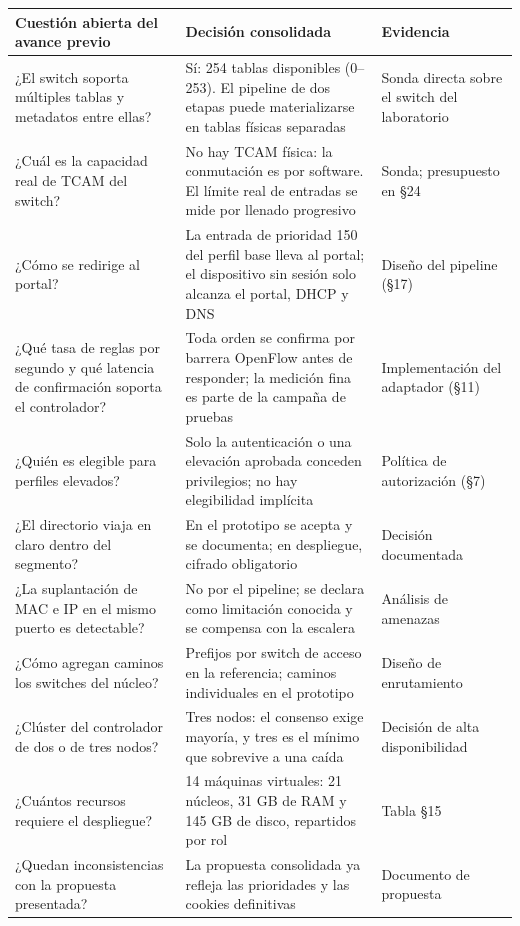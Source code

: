\documentclass[11pt,a4paper]{article}
\begin{document}
\begin{longtable}{p{4.2cm}p{5.2cm}p{4.6cm}}
\toprule
\textbf{Cuestión abierta del avance previo} & \textbf{Decisión consolidada} & \textbf{Evidencia}\\
\midrule
¿El switch soporta múltiples tablas y metadatos entre ellas? & Sí: 254 tablas disponibles (0--253). El pipeline de dos etapas puede materializarse en tablas físicas separadas & Sonda directa sobre el switch del laboratorio\\
¿Cuál es la capacidad real de TCAM del switch? & No hay TCAM física: la conmutación es por software. El límite real de entradas se mide por llenado progresivo & Sonda; presupuesto en §24\\
¿Cómo se redirige al portal? & La entrada de prioridad 150 del perfil base lleva al portal; el dispositivo sin sesión solo alcanza el portal, DHCP y DNS & Diseño del pipeline (§17)\\
¿Qué tasa de reglas por segundo y qué latencia de confirmación soporta el controlador? & Toda orden se confirma por barrera OpenFlow antes de responder; la medición fina es parte de la campaña de pruebas & Implementación del adaptador (§11)\\
¿Quién es elegible para perfiles elevados? & Solo la autenticación o una elevación aprobada conceden privilegios; no hay elegibilidad implícita & Política de autorización (§7)\\
¿El directorio viaja en claro dentro del segmento? & En el prototipo se acepta y se documenta; en despliegue, cifrado obligatorio & Decisión documentada\\
¿La suplantación de MAC e IP en el mismo puerto es detectable? & No por el pipeline; se declara como limitación conocida y se compensa con la escalera & Análisis de amenazas\\
¿Cómo agregan caminos los switches del núcleo? & Prefijos por switch de acceso en la referencia; caminos individuales en el prototipo & Diseño de enrutamiento\\
¿Clúster del controlador de dos o de tres nodos? & Tres nodos: el consenso exige mayoría, y tres es el mínimo que sobrevive a una caída & Decisión de alta disponibilidad\\
¿Cuántos recursos requiere el despliegue? & 14 máquinas virtuales: 21 núcleos, 31 GB de RAM y 145 GB de disco, repartidos por rol & Tabla §15\\
¿Quedan inconsistencias con la propuesta presentada? & La propuesta consolidada ya refleja las prioridades y las cookies definitivas & Documento de propuesta\\
\bottomrule
\end{longtable}
\end{document}
